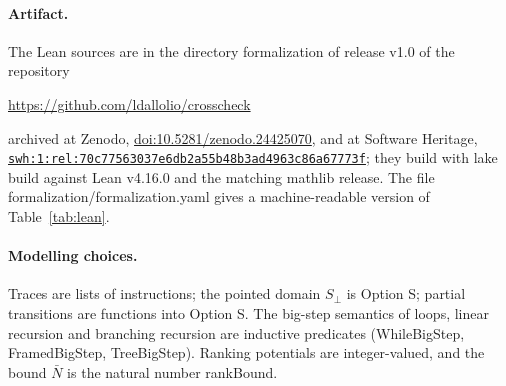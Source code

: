 \documentclass[oneside,english]{amsart}
\numberwithin{equation}{section}
\numberwithin{figure}{section}
\theoremstyle{plain}
\theoremstyle{definition}
\theoremstyle{plain}
\theoremstyle{remark}
\theoremstyle{plain}
\theoremstyle{definition}
\theoremstyle{plain}
\theoremstyle{remark}
\newcommand{\lean}[1]{{\ttfamily\small #1}}
\begin{document}
\paragraph{Artifact.}
The Lean sources are in the directory \lean{formalization} of release v1.0 of the repository
\begin{center}\url{https://github.com/ldallolio/crosscheck}\end{center}
archived at Zenodo, \href{https://doi.org/10.5281/zenodo.24425070}{doi:10.5281/zenodo.24425070}, and at Software Heritage, \href{https://archive.softwareheritage.org/swh:1:rel:70c77563037e6db2a55b48b3ad4963c86a67773f}{\nolinkurl{swh:1:rel:70c77563037e6db2a55b48b3ad4963c86a67773f}}; they build with \lean{lake build} against Lean \lean{v4.16.0} and the matching mathlib release. The file \lean{formalization/formalization.yaml} gives a machine-readable version of Table~\ref{tab:lean}.

\paragraph{Modelling choices.}
Traces are lists of instructions; the pointed domain $S_\bot$ is \lean{Option S}; partial transitions are functions into \lean{Option S}. The big-step semantics of loops, linear recursion and branching recursion are inductive predicates (\lean{WhileBigStep}, \lean{FramedBigStep}, \lean{TreeBigStep}). Ranking potentials are integer-valued, and the bound $\bar{N}$ is the natural number \lean{rankBound}.
\end{document}
